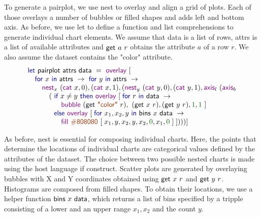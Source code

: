 \documentclass{jfp}
\newcommand{\num}[1]{\textcolor{numclr}{#1}}
\newcommand{\str}[1]{\textnormal{\textcolor{strclr}{\sffamily "#1"}}}
\newcommand{\strf}[1]{\textnormal{\textcolor{strclr}{\sffamily #1}}}
\newcommand{\ident}[1]{\textnormal{\textcolor{idclr}{\sffamily #1}}}
\newcommand{\kvd}[1]{\textnormal{\textcolor{kvdclr}{\sffamily #1}}}
\newcommand{\fkvd}[1]{\textnormal{\textcolor{fkvdclr}{\sffamily #1}}}
\begin{document}
To generate a pairplot, we use \kvd{nest} to overlay and align a grid of plots. Each of those
overlays a number of bubbles or filled shapes and adds left and bottom axis. As before, we use
\fkvd{let} to define a function and list comprehensions to generate individual chart elements.
We assume that \ident{data} is a list of rows, \ident{attrs} is a list of available attributes and
$\ident{get}~a~r$ obtains the attribute $a$ of a row $r$. We also assume the dataset contains the \str{color} attribute.
%
\begin{equation*}
\begin{array}{l}
\fkvd{let}~\ident{pairplot}~\ident{attrs}~\ident{data}~=~\kvd{overlay}~[\\
\quad \fkvd{for}~x~\fkvd{in}~\ident{attrs}~\rightarrow~\fkvd{for}~y~\fkvd{in}~\ident{attrs}~\rightarrow\\
\qquad \kvd{nest}_x~(\kvd{cat}~x, 0), (\kvd{cat}~x, 1), (\kvd{nest}_y~(\kvd{cat}~y, 0), (\kvd{cat}~y, 1), \kvd{axis}_l~(\kvd{axis}_b\\
\quad\qquad (~\fkvd{if}~x \neq y~\fkvd{then}~\kvd{overlay}~[\;\fkvd{for}~r~\fkvd{in}~\ident{data}~\rightarrow~\\
\qquad\qquad \hspace{0.7em} \kvd{bubble}~(\ident{get}~\str{color}~r),~(\ident{get}~x~r), (\ident{get}~y~r), \num{1}, \num{1}~]\\
 \quad\qquad \hspace{0.7em} \fkvd{else}~\kvd{overlay}~[\;\fkvd{for}~x_1, x_2, y~\fkvd{in}~\ident{bins}~x~\ident{data}~\rightarrow~\\
\qquad\qquad \hspace{0.7em}  \kvd{fill}~\strf{\#808080}~[\; x_1, y, x_2, y, x_2, \num{0}, x_1, \num {0}\;]\;])))] \\
\end{array}
\end{equation*}

\vspace{-0.5em}
\noindent
As before, \kvd{nest} is essential for composing individual charts. Here, the points that determine
the locations of individual charts are categorical values defined by the attributes of the dataset.
The choice between two possible nested charts is made using the host language \fkvd{if} construct.
Scatter plots are generated by overlaying bubbles with X and Y coordinates obtained using $\ident{get}~x~r$
and $\ident{get}~y~r$. Histograms are composed from filled shapes. To obtain their locations, we use
a helper function $\ident{bins}~x~\ident{data}$, which returns a list of bins specified by a tripple
consisting of a lower and an upper range $x_1, x_2$ and the count $y$.
\end{document}
